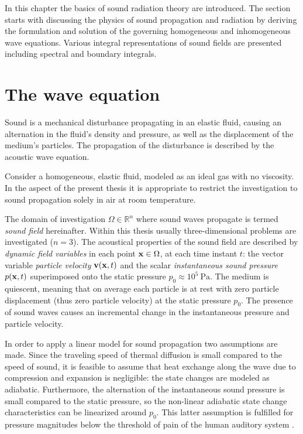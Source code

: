 In this chapter the basics of sound radiation theory are introduced.
The section starts with discussing the physics of sound propagation and radiation by deriving the formulation and solution of the governing homogeneous and inhomogeneous wave equations. 
Various integral representations of sound fields are presented including spectral and boundary integrals.
%

\section{The wave equation}

Sound is a mechanical disturbance propagating in an elastic fluid, causing an alternation in the fluid's density and pressure, as well as the displacement of the medium's particles.
The propagation of the disturbance is described by the acoustic wave equation.

Consider a homogeneous, elastic fluid, modeled as an ideal gas with no viscosity. 
In the aspect of the present thesis it is appropriate to restrict the investigation to sound propagation solely in air at room temperature.

The domain of investigation $\Omega \in \mathbb{R}^n$ where sound waves propagate is termed \emph{sound field} hereinafter.
Within this thesis usually three-dimensional problems are investigated ($n = 3$).
The acoustical properties of the sound field are described by \emph{dynamic field variables} in each point $\mathbf{x} \in \Omega$, at each time instant $t$: the vector variable \emph{particle velocity} $\mathbf{v}(\mathbf{x},t)$ and the scalar \emph{instantaneous sound pressure} $p(\mathbf{x},t)$ superimposed onto the static pressure $p_0 \approx 10^5~\mathrm{Pa}$.
The medium is quiescent, meaning that on average each particle is at rest with zero particle displacement (thus zero particle velocity) at the static pressure $p_0$. 
The presence of sound waves causes an incremental change in the instantaneous pressure and particle velocity.

In order to apply a linear model for sound propagation two assumptions are made.
Since the traveling speed of thermal diffusion is small compared to the speed of sound, it is feasible to assume that heat exchange along the wave due to compression and expansion is negligible: the state changes are modeled as adiabatic.
Furthermore, the alternation of the instantaneous sound pressure is small compared to the static pressure, so the non-linear adiabatic state change characteristics can be linearized around $p_0$.
This latter assumption is fulfilled for pressure magnitudes below the threshold of pain of the human auditory system \cite{Gumerov2004, Ahrens2012}.

